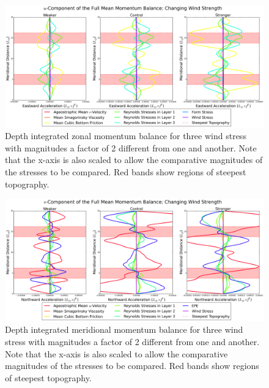 \documentclass[12pt,a4paper]{report}
\begin{document}
 	\begin{figure}
 		\centering
 		\includegraphics[width=\linewidth]{umom_1_4}
 		\caption{ Depth integrated zonal momentum balance for three wind
 			stress with magnitudes a factor of 2 different from one and another.
 			Note that the x-axis is also scaled to allow the comparative magnitudes
 			of the stresses to be compared. Red bands show regions of steepest topography.}
 		\label{fig:umombalancewindstrength}
 	\end{figure}
 	
 	\begin{figure}
 		\centering
 		\includegraphics[width=\linewidth]{vmom_1_4}
 		\caption{ Depth integrated meridional momentum balance for three wind
 			stress with magnitudes a factor of 2 different from one and another.
 			Note that the x-axis is also scaled to allow the comparative magnitudes
 			of the stresses to be compared. Red bands show regions of steepest topography.}
 		\label{fig:vmombalancewindstrength}
 	\end{figure}
 	
\end{document}
